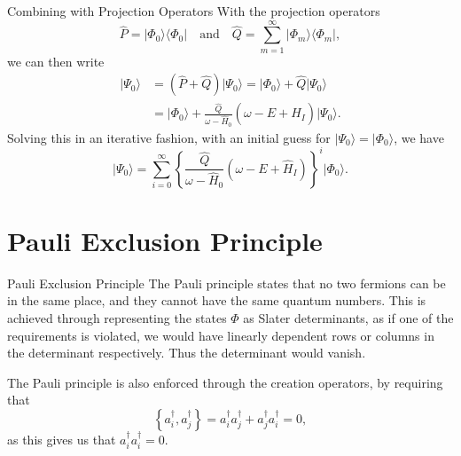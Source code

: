 \documentclass[UKenglish,aspectratio=169]{beamer}
\begin{document}
\begin{frame}{Combining with Projection Operators}
    With the projection operators
    \begin{equation}
        \hat{P} = \lvert \Phi_0 \rangle \langle \Phi_0 \rvert
        \quad \text{and} \quad
        \hat{Q} = \sum_{m = 1}^\infty \lvert \Phi_m \rangle \langle \Phi_m \rvert,
    \end{equation}
    we can then write
    \begin{equation}
        \begin{split}
            \lvert \Psi_0 \rangle
            &= \left( \hat{P} + \hat{Q} \right) \lvert \Psi_0 \rangle
            = \vert \Phi_0 \rangle + \hat{Q} \lvert \Psi_0 \rangle \\
            &= \vert \Phi_0 \rangle + \frac{\hat{Q}}{\omega - \hat{H}_0} \left( \omega - E + \hat{H}_I \right) \lvert \Psi_0 \rangle.
        \end{split}
    \end{equation}
    Solving this in an iterative fashion, with an initial guess for $\lvert \Psi_0 \rangle = \lvert \Phi_0 \rangle$, we have
    \begin{equation}
        \vert \Psi_0 \rangle = \sum_{i = 0}^\infty \left\{
            \frac{\hat{Q}}{\omega - \hat{H}_0} \left( \omega - E + \hat{H}_I \right)
        \right\}^{i} \lvert \Phi_0 \rangle.
    \end{equation}
\end{frame}

\section{Pauli Exclusion Principle}

\begin{frame}{Pauli Exclusion Principle}
    The Pauli principle states that no two fermions can be in the same place, and they cannot have the same quantum numbers.
    This is achieved through representing the states $\Phi$ as Slater determinants, as if one of the requirements is violated, we would have linearly dependent rows or columns in the determinant respectively.
    Thus the determinant would vanish.

    \medskip

    The Pauli principle is also enforced through the creation operators, by requiring that
    \begin{equation}
        \left\{ a_i^\dagger, a_j^\dagger \right\} = a_i^\dagger a_j^\dagger + a_j^\dagger a_i^\dagger = 0,
    \end{equation}
    as this gives us that $a_i^\dagger a_i^\dagger = 0$.
\end{frame}
\end{document}
